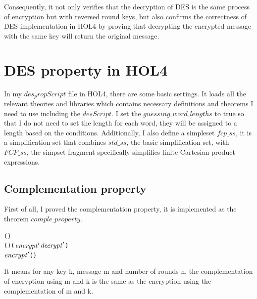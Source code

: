 \documentclass{article}
\begin{document}
Consequently, it not only verifies that the decryption of DES is the same process of encryption but with reversed round keys,
but also confirms the correctness of DES implementation in HOL4 by proving that decrypting the encrypted message with the same key
will return the original message.

\section{DES property in HOL4}
In my $des_propScript$ file in HOL4, there are some basic settings. It loads all the relevant theories and libraries which contains
necessary definitions and theorems I need to use including the $desScript$. I set the $guessing\_word\_lengths$ to true so that
I do not need to set the length for each word, they will be assigned to a length based on the conditions. Additionally, I also define a simpleset
$fcp\_ss$, it is a simplification set that combines $std\_ss$, the basic simplification set, with $FCP\_ss$, the simpset fragment
specifically simplifies finite Cartesian product expressions.

\subsection{Complementation property}
First of all, I proved the complementation property, it is implemented as the theorem $comple\_property$.

\begin{alltt}
\HOLTokenTurnstile{}  \HOLSymConst{\HOLTokenLt{}}  \HOLSymConst{\HOLTokenConj{}}  \HOLSymConst{\HOLTokenLt{}}  \HOLSymConst{\HOLTokenConj{}}    \HOLSymConst{=} (\HOLSymConst{,}) \HOLSymConst{\HOLTokenConj{}}
     (\HOLSymConst{\HOLTokenNeg{}}) \HOLSymConst{=} (\ensuremath{\HOLFreeVar{encrypt}\sp{\prime{}}}\HOLSymConst{,}\ensuremath{\HOLFreeVar{decrypt}\sp{\prime{}}}) \HOLSymConst{\HOLTokenImp{}}
   \HOLSymConst{\HOLTokenNeg{}}  \HOLSymConst{=} \ensuremath{\HOLFreeVar{encrypt}\sp{\prime{}}} (\HOLSymConst{\HOLTokenNeg{}})
\end{alltt}

It means for any key k, message m and number of rounds n, the complementation of encryption using m and k is the
same as the encryption using the complementation of m and k.
\end{document}
